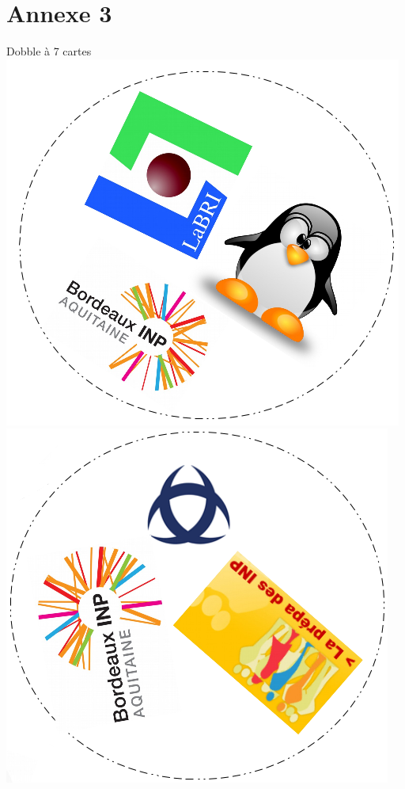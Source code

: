 \documentclass[a4paper]{article}
\begin{document}
\section*{Annexe 3}
Dobble à 7 cartes\bigskip\\
\includegraphics[scale=0.43]{dobble1.png}
\includegraphics[scale=0.43]{dobble2.png}\\
\end{document}
